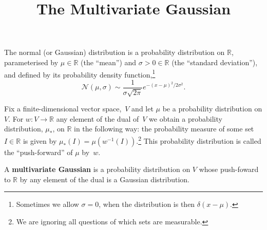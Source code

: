 \documentclass[10pt, a4paper, twocolumn]{article}
\title{The Multivariate Gaussian}
\newcommand{\R}{\mathbb{R}}
\newcommand{\N}{\mathcal{N}}
\newcommand{\defn}[1]{\textbf{#1}}
\begin{document}
\maketitle
The normal (or Gaussian) distribution is a probability distribution on $\R$,
parameterised by $\mu\in\R$ (the “mean”) and $\sigma>0 \in\R$ (the “standard deviation”),
and defined by its probability density function,\footnote{Sometimes we allow
  $\sigma=0$, when the distribution is then $\delta(x-\mu)$.}
\begin{equation*}
  \N(\mu, \sigma) \sim \frac{1}{\sigma\sqrt{2\pi}} e^{-(x-\mu)^2/2\sigma^2}.
\end{equation*}

Fix a finite-dimensional vector space,~$V$ and let $\mu$ be a probability
distribution on $V$. For $w:V\to\R$ any element of the dual of~$V$ we obtain a
probability distribution, $\mu_*$, on $\R$ in the following way: the probability
measure of some set $I\in\R$ is given by $\mu_*(I) = \mu(w^{-1}(I))$.\footnote{We are
  ignoring all questions of which sets are measurable.} This probability
distribution is called the “push-forward” of $\mu$ by~$w$.

A \defn{multivariate Gaussian} is a probability distribution on $V$ whose
push-foward to $\R$ by any element of the dual is a Gaussian distribution.
\end{document}
